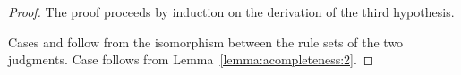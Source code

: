 \begin{proof}
The proof proceeds by induction on the derivation of the third hypothesis.

Cases  and  follow from the isomorphism
between the rule sets of the two judgments. Case  follows
from Lemma~\ref{lemma:acompleteness:2}.
\end{proof}\vspace{0.3cm}

{\centering
{}}


